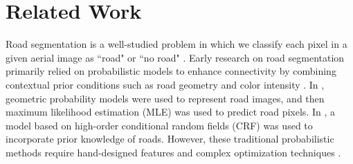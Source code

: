 \documentclass[letterpaper, 10 pt, conference]{ieeeconf}
\begin{document}
\section{Related Work}
  Road segmentation is a well-studied problem in which we classify each pixel in a given aerial image as ``road" or ``no road" \cite{bastani2018roadtracer}. Early research on road segmentation primarily relied on probabilistic models to enhance connectivity by combining contextual prior conditions such as road geometry \cite{6185661, stoica2004gibbs} and color intensity \cite{WANG2016271}. In \cite{barzohar1996automatic}, geometric probability models were used to represent road images, and then maximum likelihood estimation (MLE) was used to predict road pixels. In \cite {wegner2013higher}, a model based on high-order conditional random fields (CRF) was used to incorporate prior knowledge of roads. However, these traditional probabilistic methods require hand-designed features and complex optimization techniques \cite{6185661}.
\end{document}
